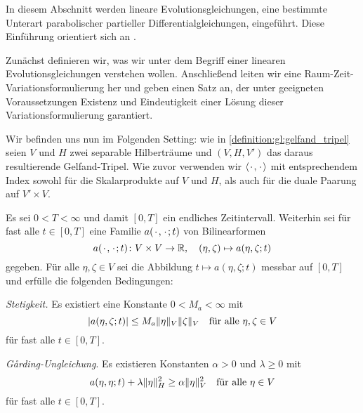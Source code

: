 In diesem Abschnitt werden lineare Evolutionsgleichungen, eine bestimmte Unterart parabolischer partieller Differentialgleichungen, eingeführt.
Diese Einführung orientiert sich an \textcite{Lions:1971wp,Schwab:2009ec,Urban:2014kg}.

Zunächst definieren wir, was wir unter dem Begriff einer linearen Evolutionsgleichungen verstehen wollen.
Anschließend leiten wir eine Raum-Zeit-Variationsformulierung her und geben einen Satz an, der unter geeigneten Voraussetzungen Existenz und Eindeutigkeit einer Lösung dieser Variationsformulierung garantiert.

Wir befinden uns nun im Folgenden Setting:
wie in \cref{definition:gl:gelfand_tripel} seien $V$ und $H$ zwei separable Hilberträume und $(V, H, V')$ das daraus resultierende Gelfand-Tripel.
Wie zuvor verwenden wir $\left\langle{\mkern2mu\cdot\mkern2mu},{\mkern2mu\cdot\mkern2mu}\right\rangle$ mit entsprechendem Index sowohl für die Skalarprodukte auf $V$ und $H$, als auch für die duale Paarung auf $V' \times V$.

Es sei $0 < T < \infty$ und damit $[0, T]$ ein endliches Zeitintervall.
Weiterhin sei für fast alle $t \in [0, T]$ eine Familie $a({\mkern2mu\cdot\mkern2mu}, {\mkern2mu\cdot\mkern2mu}; t)$ von Bilinearformen
\begin{equation}
    \label{eq:gl:familie_bf_a}
    a(\blank, \blank; t) \colon V \times V \to \mathbb{R}, \quad (\eta, \zeta) \mapsto a(\eta, \zeta; t)
\end{equation}
gegeben.
Für alle $\eta, \zeta \in V$ sei die Abbildung $t \mapsto a(\eta, \zeta; t)$ messbar auf $[0, T]$ und erfülle die folgenden Bedingungen:

\begin{Annahme}
\label{annahme:eigenschaften_bf_a}
    \leavevmode
    \begin{thmenumerate}
        \item \emph{Stetigkeit.}
        Es existiert eine Konstante $0 < M_{a} < \infty$ mit
        \begin{equation}
            \label{eq:allgemeine_parabolische_pde:bf_stetig}
            \abs{a(\eta, \zeta; t)} \leq M_{a} \norm{\eta}_{V} \norm{\zeta}_{V} \quad \fa \eta, \zeta \in V
        \end{equation}
        für fast alle $t \in [0, T]$.
        \item \emph{G\r{a}rding-Ungleichung}.
        Es existieren Konstanten $\alpha > 0$ und $\lambda \geq 0$ mit
        \begin{equation}
            \label{eq:allgemeine_parabolische_pde:bf_garding}
            a(\eta, \eta; t) + \lambda \norm{\eta}_{H}^{2} \geq \alpha \norm{\eta}_{V}^{2} \quad \fa \eta \in V
        \end{equation}
        für fast alle $t \in [0, T]$.
    \end{thmenumerate}
\end{Annahme}

